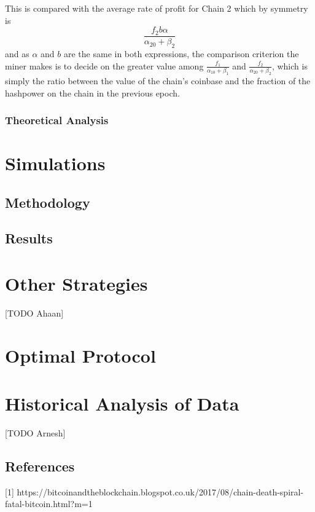 \documentclass[12pt, preprint]{aastex}
\begin{document}
This is compared with the average rate of profit for Chain 2 which by symmetry is 
$$
\frac{f_2b\alpha}{\alpha_{20} + \beta_2}
$$
and as $\alpha$ and $b$ are the same in both expressions, the comparison criterion the miner makes is to decide on the greater value among $\frac{f_1}{\alpha_{10} + \beta_1}$ and $\frac{f_2}{\alpha_{20} + \beta_2}$, which is simply the ratio between the value of the chain's coinbase and the fraction of the hashpower on the chain in the previous epoch.

\subsubsection{Theoretical Analysis}


\section{Simulations}

\subsection{Methodology}


\subsection{Results}


\section{Other Strategies}
[TODO Ahaan]


\section{Optimal Protocol}

\section{Historical Analysis of Data}
[TODO Arnesh]



\subsection{References}
[1] https://bitcoinandtheblockchain.blogspot.co.uk/2017/08/chain-death-spiral-fatal-bitcoin.html?m=1
\end{document}

